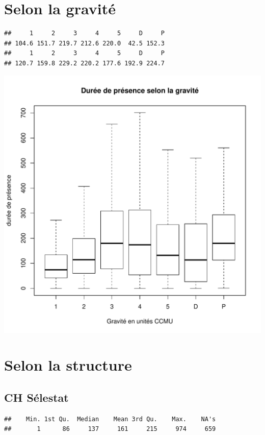 \documentclass[12pt,english,french,twoside]{report}\usepackage[]{graphicx}\usepackage[]{color}
\makeatletter
\def\maxwidth{ %
  \ifdim\Gin@nat@width>\linewidth
    \linewidth
  \else
    \Gin@nat@width
  \fi
}
\newenvironment{kframe}{%
 \def\at@end@of@kframe{}%
 \ifinner\ifhmode%
  \def\at@end@of@kframe{\end{minipage}}%
  \begin{minipage}{\columnwidth}%
 \fi\fi%
 \def\FrameCommand##1{\hskip\@totalleftmargin \hskip-\fboxsep
 \colorbox{shadecolor}{##1}\hskip-\fboxsep
     \hskip-\linewidth \hskip-\@totalleftmargin \hskip\columnwidth}%
 \MakeFramed {\advance\hsize-\width
   \@totalleftmargin\z@ \linewidth\hsize
   \@setminipage}}%
 {\par\unskip\endMakeFramed%
 \at@end@of@kframe}
\newenvironment{knitrout}{}{} %
\makeatother
\begin{document}
\section*{Selon la gravité}
\begin{knitrout}
\color{fgcolor}\begin{kframe}
\begin{verbatim}
##     1     2     3     4     5     D     P 
## 104.6 151.7 219.7 212.6 220.0  42.5 152.3
##     1     2     3     4     5     D     P 
## 120.7 159.8 229.2 220.2 177.6 192.9 224.7
\end{verbatim}
\end{kframe}
\includegraphics[width=\maxwidth]{figure/duree_gravite} 

\end{knitrout}


\section*{Selon la structure}
\subsection{CH Sélestat}
\begin{knitrout}
\color{fgcolor}\begin{kframe}
\begin{verbatim}
##    Min. 1st Qu.  Median    Mean 3rd Qu.    Max.    NA's 
##       1      86     137     161     215     974     659
\end{verbatim}
\end{kframe}
\end{knitrout}
\end{document}
